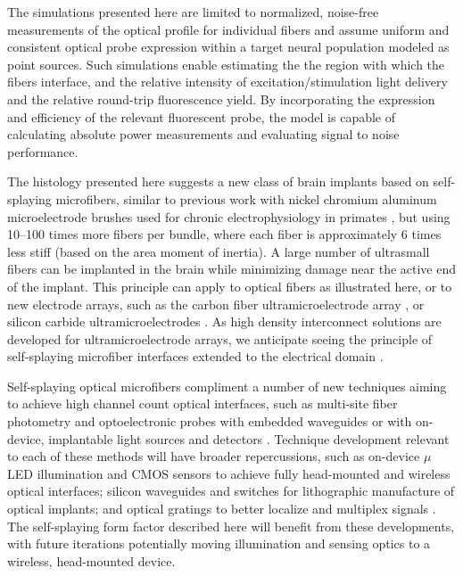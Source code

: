 The simulations presented here are limited to normalized, 
noise-free measurements of the optical profile for individual 
fibers and assume uniform and consistent optical probe 
expression within a target neural population modeled as point 
sources. Such simulations enable estimating the the region with 
which the fibers interface, and the relative intensity of 
excitation/stimulation light delivery and the relative round-trip 
fluorescence yield. By incorporating the expression and 
efficiency of the relevant fluorescent probe, the 
model is capable of calculating absolute power measurements and evaluating 
signal to noise performance.

The histology presented here suggests a new class of brain 
implants based on self-splaying microfibers, similar to 
previous work with nickel chromium aluminum 
microelectrode brushes used for chronic electrophysiology 
in primates \cite{Kruger:2010jz}, but using 10--100 times 
more fibers per bundle, where each fiber is approximately 
6 times less stiff (based on the area 
moment of inertia). A large number of ultrasmall fibers can 
be implanted in the brain while minimizing damage near the 
active end of the implant. This principle can apply to optical 
fibers as illustrated here, or to new electrode arrays, such 
as the carbon fiber ultramicroelectrode array 
\cite{Guitchounts:2013bs}, or silicon carbide 
ultramicroelectrodes \cite{Deku:2017el,Pancrazio:2017fi}. As 
high density interconnect solutions are developed for 
ultramicroelectrode arrays, we anticipate seeing the principle 
of self-splaying microfiber interfaces extended to the 
electrical domain \cite{oro52681}.

Self-splaying optical microfibers compliment a number of new 
techniques aiming to achieve high channel count optical 
interfaces, such as multi-site fiber photometry 
\cite{Guo:2015gu} and optoelectronic probes with embedded 
waveguides or with on-device, implantable light sources and 
detectors \cite{Warden:2014bx,Wu:2015gk,Segev:2017en}. 
Technique development relevant to each of these methods will 
have broader repercussions, such as on-device $\mu$LED illumination 
and CMOS sensors to achieve fully head-mounted and wireless 
optical interfaces; silicon waveguides and switches for 
lithographic manufacture of optical implants; and optical 
gratings to better localize and multiplex signals 
\cite{Segev:2015ez}. The self-splaying form factor described 
here will benefit from these developments, with future 
iterations potentially moving illumination and sensing optics 
to a wireless, head-mounted device.

